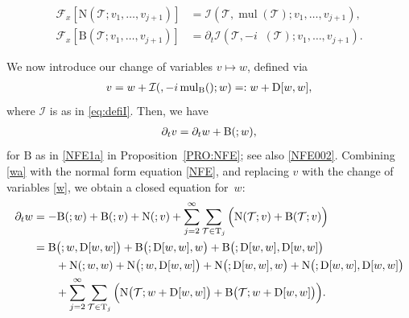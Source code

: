\documentclass[%
11pt,  reqno]{amsart}
\makeatletter
\newcommand{\5}{\textup{V}}
\newcommand{\noi}{\noindent}
\newcommand{\dt}{\partial_t}
\theoremstyle{remark}
\newcommand{\TT}{\mathcal{T}}
\newcommand{\Tr}{\mathrm{T}}
\newcommand{\Ft}{{\mathcal{F}}}
\DeclareMathOperator{\mul}{mul}
\DeclareMathOperator{\mulB}{mul_{\BB}}
\def\<#1>{\csname MH@symb@#1\endcsname}
\newcommand{\Ical}{\mathcal{I}}
\numberwithin{equation}{section}
\numberwithin{theorem}{section}
\newcommand{\NN}{\mathrm{N}}
\newcommand{\BB}{\mathrm{B}}
\newcommand{\D}{\mathrm{D}}
\makeatother
\begin{document}
\noi
\begin{align*}
\Ft_x [\NN(\TT; v_1, \ldots, v_{j+1} ) ] 
&= 
\Ical(\TT,\mul(\TT) ; v_1, \ldots,
v_{j+1} )
, \\
\Ft_x [\BB(\TT; v_1, \ldots, v_{j+1}) ]  &=
\dt\Ical (\TT,- i \mulB(\TT) ; v_1,\dots,v_{j+1}).
\end{align*}


We now introduce our change of variables $v\mapsto w$, defined via
\begin{align}
\label{w}
v 
=
w + \Ical(\<1>, - i \mulB(\<1>); w)
=:
w + \D[w, w]
,
\end{align}
where $\Ical$ is as in \eqref{eq:defiI}. Then, we have
\begin{align}
\label{wa}
\dt v
=
\dt w  + \BB(\<1>; w), 
\end{align}
for $\BB$ as in 
\eqref{NFE1a} in 
Proposition~\ref{PRO:NFE}; see also \eqref{NFE002}.
%
Combining \eqref{wa} with the normal form equation \eqref{NFE}, and replacing $v$ with the change of variables \eqref{w}, we obtain a closed equation for~$w$:
\begin{align}
\dt w & = -  \BB(\<1>;w) + \BB(\<1>;v) + \NN(\<1>;v)
+ \sum_{j=2}^\infty \sum_{\TT\in\Tr_j} \Big( \NN(\TT; v)  +
\BB(\TT; v) 
 \Big) \nonumber\\
& = 
 \BB\big(\<1>; w, \D[w, w] \big) 
+ \BB \big(\<1>; \D[w, w],w\big) 
+
\BB\big(\<1>; \D[w,w], \D[w, w]\big) 
  \nonumber\\
& \qquad 
+ \NN(\<1>; w ,w )  + \NN\big(\<1>; w, \D[w, w]\big) 
+
\NN\big(\<1>; \D[w, w], w\big) 
+ \NN\big(\<1>; \D[w, w],\D[w, w]\big) 
 \nonumber\\
& \qquad 
+ \sum_{j=2}^\infty \sum_{\TT\in \Tr_j} 
\Big( \NN\big(\TT; w+
\D[w, w]
\big) 
+  \BB\big(\TT; w + \D[w, w]\big) \Big).
\label{w1}
\end{align}
\end{document}
